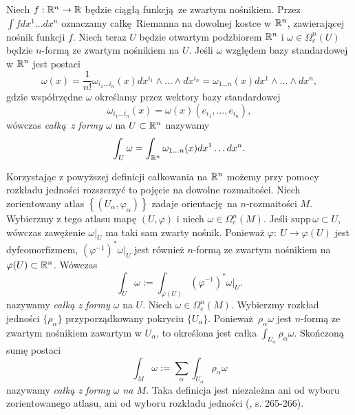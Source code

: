 Niech \(f: \mathbb{R}^n \to \mathbb{R}\) będzie ciągłą funkcją ze zwartym nośnikiem. Przez \(\int f dx^1 \dots dx^n\) oznaczamy całkę Riemanna na dowolnej kostce w \(\mathbb{R}^n\), zawierającej nośnik funkcji \(f\). Niech teraz \(U\) będzie otwartym podzbiorem \(\mathbb{R}^n\) i \(\omega\in\Omega^n_c(U)\) będzie \(n\)-formą ze zwartym nośnikiem na \(U\). Jeśli \(\omega\) względem bazy standardowej w \(\mathbb{R}^n\) jest postaci
\begin{equation*}
    \omega(x)=\frac{1}{n!} \omega_{i_1\dots i_n}(x) dx^{i_1}\wedge\dots\wedge dx^{i_n} = \omega_{1\dots n}(x)dx^1\wedge\dots\wedge dx^n,
\end{equation*}
gdzie współrzędne \(\omega\) określamy przez wektory bazy standardowej
\begin{equation*}
    \omega_{i_1\dots i_n}(x) = \omega(x)(e_{i_1}, \dots, e_{i_n}),
\end{equation*}
wówczas \emph{całką z formy \(\omega\)} na \(U\subset\mathbb{R}^n\) nazywamy
\begin{equation*}
    \int_U \omega = \int_{\mathbb{R}^n} \omega_{1\dots n}(x) dx^1\dots dx^n.
\end{equation*}

Korzystając z powyższej definicji całkowania na \(\mathbb{R}^n\) możemy przy pomocy rozkładu jedności rozszerzyć to pojęcie na dowolne rozmaitości. Niech zorientowany atlas \(\left\{(U_{\alpha}, \varphi_{\alpha})\right\}\) zadaje orientację na \(n\)-rozmaitości \(M\). Wybierzmy z tego atlasu mapę \((U, \varphi)\) i niech \(\omega\in\Omega^n_c(M)\). Jeśli \(\mathrm{supp}\,\omega \subset U\), wówczas zawężenie \(\left.\omega\right|_U\) ma taki sam zwarty nośnik. Ponieważ \(\varphi:\:U\to\varphi(U)\) jest dyfeomorfizmem, \((\varphi^{-1})^\ast\left.\omega\right|_U\) jest również \(n\)-formą ze zwartym nośnikiem na \(\varphi(U)\subset\mathbb{R}^n\). Wówczas
\begin{equation*}
    \int_U \omega := \int_{\varphi(U)} (\varphi^{-1})^{\ast}\left.\omega\right|_U.
\end{equation*}
nazywamy \emph{całką z formy \(\omega\)} na \(U\).  
Niech \(\omega\in\Omega^n_c(M)\). Wybierzmy rozkład jedności \(\{\rho_{\alpha}\}\) przyporządkowany pokryciu \(\{U_{\alpha}\}\). Ponieważ \(\rho_{\alpha}\omega\) jest \(n\)-formą ze zwartym nośnikiem zawartym w \(U_{\alpha}\), to określona jest całka \(\int_{U_\alpha} \rho_{\alpha} \omega\). Skończoną sumę postaci
\begin{equation*}
    \int_M \omega := \sum_{\alpha} \int_{U_{\alpha}} \rho_{\alpha}\omega 
\end{equation*}
nazywamy \emph{całką z formy \(\omega\) na \(M\)}. Taka definicja jest niezależna ani od wyboru zorientowanego atlasu, ani od wyboru rozkładu jedności (\cite{tu}, s. 265-266).

